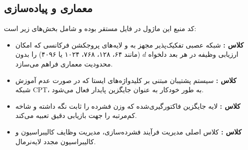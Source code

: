 \subsection{معماری و پیاده‌سازی}
کد منبع این ماژول در فایل  مستقر بوده و شامل بخش‌های زیر است:
\begin{itemize}
    \item \textbf{کلاس :} شبکه عصبی تفکیک‌پذیر مجهز به  و لایه‌های پروجکشن فرکانسی که امکان ارزیابی وظیفه در هر بعد دلخواه $d$ (مانند ۶۴، ۱۲۸، ۷۶۸، ۱۰۲۴ یا ۴۰۹۶) را بدون محدودیت معماری فراهم می‌سازد.
    \item \textbf{کلاس :} سیستم پشتیبان مبتنی بر کلیدواژه‌های ایستا که در صورت عدم آموزش شبکه CPT، به طور خودکار به عنوان جایگزین پایدار فعال می‌شود.
    \item \textbf{کلاس :} لایه جایگزین فاکتورگیری‌شده که وزن فشرده را ثابت نگه داشته و شاخه کم‌مرتبه  را جهت بازیابی دقیق تعبیه می‌کند.
    \item \textbf{کلاس :} کلاس اصلی مدیریت فرآیند فشرده‌سازی، مدیریت وظایف کالیبراسیون و کالیبراسیون مجدد لایه‌نرمال.
\end{itemize}
